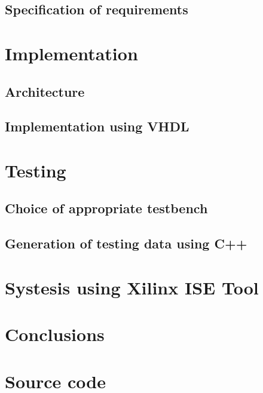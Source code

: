 \documentclass[12pt,a4paper,openright]{report}
\begin{document}
\section{Specification of requirements}




\chapter{Implementation}

\section{Architecture}

\section{Implementation using VHDL}




\chapter{Testing}

\section{Choice of appropriate testbench}

\section{Generation of testing data using C++}




\chapter{Systesis using Xilinx ISE Tool}




\chapter{Conclusions}




\appendix

\chapter{Source code}
\end{document}
